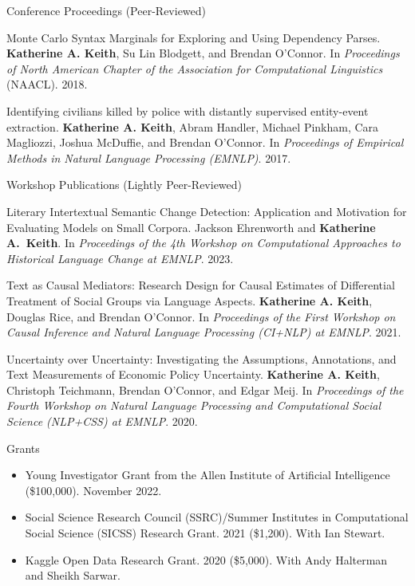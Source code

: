 \documentclass{resume} %
\begin{document}
\begin{rSection}{Conference Proceedings (Peer-Reviewed)}
\begin{etaremune}
\item Monte Carlo Syntax Marginals for Exploring and Using Dependency Parses.
\textbf{Katherine A. Keith}, Su Lin Blodgett, and Brendan O'Connor.
In \emph{Proceedings of North American Chapter of the Association for Computational Linguistics} (NAACL). 2018.

\item Identifying civilians killed by police with distantly supervised entity-event extraction. 
\textbf{Katherine A. Keith}, Abram Handler, Michael Pinkham, Cara Magliozzi, Joshua McDuffie, and Brendan O'Connor. In \emph{Proceedings of Empirical Methods in Natural Language Processing (EMNLP)}. 2017. 

\end{etaremune}
\end{rSection}

\begin{rSection}{Workshop Publications (Lightly Peer-Reviewed)}
\begin{etaremune}

\item Literary Intertextual Semantic Change Detection:
Application and Motivation for Evaluating Models on Small Corpora.
Jackson Ehrenworth and \textbf{Katherine A.~Keith}. 
In \emph{Proceedings of the 4th Workshop on Computational Approaches to Historical Language Change at EMNLP}. 2023. 


\item Text as Causal Mediators: Research Design for Causal Estimates of Differential Treatment of Social Groups via Language Aspects. \textbf{Katherine A. Keith}, Douglas Rice, and Brendan O'Connor. In \emph{Proceedings of the First Workshop on Causal Inference and Natural Language Processing (CI+NLP) at EMNLP}. 2021.  

\item Uncertainty over Uncertainty: Investigating the Assumptions, Annotations, and Text Measurements of Economic Policy Uncertainty. \textbf{Katherine A. Keith}, Christoph Teichmann, Brendan O’Connor, and Edgar Meij.  In \emph{Proceedings of the Fourth Workshop on Natural Language Processing and Computational Social Science (NLP+CSS) at EMNLP}. 2020.

\end{etaremune}
\end{rSection}

\begin{rSection}{Grants}
\begin{itemize}
\item Young Investigator Grant from the Allen Institute of Artificial Intelligence (\$100,000). November 2022. 
\item  Social Science Research Council (SSRC)/Summer Institutes in Computational Social Science (SICSS) Research Grant. 2021 (\$1,200). With Ian Stewart. 
\item  Kaggle Open Data Research Grant. 2020 (\$5,000). With Andy Halterman and Sheikh Sarwar.
\end{itemize}

\end{rSection}
\end{document}
